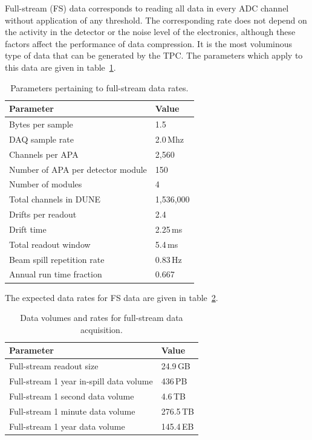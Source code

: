 Full-stream (FS) data corresponds to reading all data in every ADC channel without
application of any threshold.  The corresponding rate does not depend on the 
activity in the detector or the noise
level of the electronics, although these factors affect the performance of data compression.
It is the most voluminous type of data
that can be generated by the TPC. The parameters which apply to this data are given in
table~\ref{tab:full-stream-parameters}.

\begin{table}[ht!]
	\centering
	\begin{tabular}{| p{3in} | p{1.1in} |}
		\hline

	\textbf{Parameter} & \textbf{Value} \\ \hline
	
	Bytes per sample & 1.5 \\ \hline
	
	DAQ sample rate & 2.0\,Mhz \\ \hline
	
	Channels per APA & 2,560 \\ \hline
	
	Number of APA per detector module & 150 \\ \hline
	
	Number of modules & 4 \\ \hline
	
	Total channels in DUNE & 1,536,000 \\ \hline \hline
	
	Drifts per readout & 2.4 \\ \hline
	
	Drift time & 2.25\,ms \\ \hline

	Total readout window & 5.4\,ms \\ \hline \hline
	
	Beam spill repetition rate & 0.83\,Hz \\ \hline
	
	Annual run time fraction & 0.667 \\ \hline
	\end{tabular}
	\caption{Parameters pertaining to full-stream data rates.}
	\label{tab:full-stream-parameters}
\end{table}
The expected data rates for FS data are given
in table~\ref{tab:full-stream-volume}.
\begin{table}[ht!]
	\centering
	\begin{tabular}{| p{3in} | p{1.1in} |}
		\hline	
	
	\textbf{Parameter} & \textbf{Value} \\ \hline
	Full-stream readout size & 24.9\,GB \\ \hline
	Full-stream 1 year in-spill data volume & 436\,PB \\ \hline
	Full-stream 1 second data volume & 4.6\,TB \\
	Full-stream 1 minute data volume & 276.5\,TB \\	\hline
	Full-stream 1 year data volume & 145.4\,EB \\ \hline
	\end{tabular}
	\caption{Data volumes and rates for full-stream data acquisition.}
	\label{tab:full-stream-volume}
\end{table}
